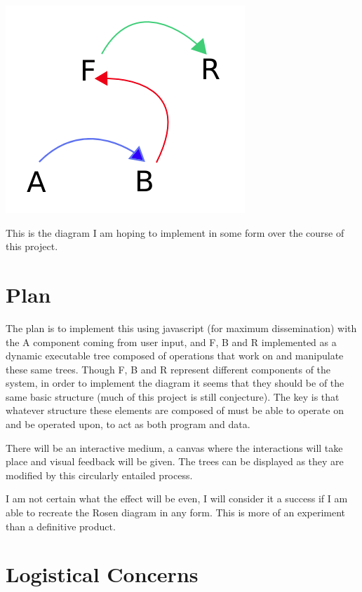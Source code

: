 \documentclass[12pt]{article}
\begin{document}
\begin{center}
\includegraphics[scale=0.6]{rosen.png}
\end{center}

This is the diagram I am hoping to implement in some form over the course of this project.  

\section{Plan}

The plan is to implement this using javascript (for maximum dissemination) with the A component coming from user input, and F, B and R implemented as a dynamic executable tree composed of operations that work on and manipulate these same trees.  Though F, B and R represent different components of the system, in order to implement the diagram it seems that they should be of the same basic structure (much of this project is still conjecture).  The key is that whatever structure these elements are composed of must be able to operate on and be operated upon, to act as both program and data.  

There will be an interactive medium, a canvas where the interactions will take place and visual feedback will be given.  The trees can be displayed as they are modified by this circularly entailed process.  

I am not certain what the effect will be even, I will consider it a success if I am able to recreate the Rosen diagram in any form.  This is more of an experiment than a definitive product.  

\section{Logistical Concerns}
\end{document}
